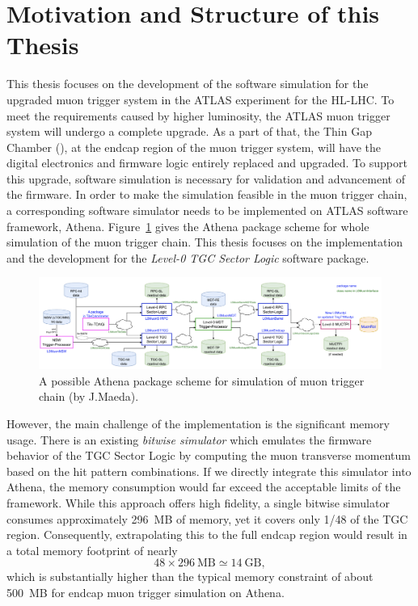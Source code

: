 \section{Motivation and Structure of this Thesis} \label{sec:motivation}
This thesis focuses on the development of the software simulation for the upgraded muon trigger system in the ATLAS experiment for the HL-LHC. To meet the requirements caused by higher luminosity, the ATLAS muon trigger system will undergo a complete upgrade. As a part of that, the Thin Gap Chamber (\TGC), at the endcap region of the muon trigger system, will have the digital electronics and firmware logic entirely replaced and upgraded. To support this upgrade, software simulation is necessary for validation and advancement of the firmware. In order to make the simulation feasible in the muon trigger chain, a corresponding software simulator needs to be implemented on ATLAS software framework, Athena. Figure~\ref{fig:L0_trigger_chain} gives the Athena package scheme for whole simulation of the muon trigger chain. This thesis focuses on the implementation and the development for the \textit{Level-0 TGC Sector Logic} software package.

\begin{figure}[htbp]
  \centering
  \includegraphics[width=1.0\textwidth]{figs/chapter1/L0_trigger_chain.png}
  \caption{A possible Athena package scheme for simulation of muon trigger chain (by J.Maeda).}
  \label{fig:L0_trigger_chain}
\end{figure}

However, the main challenge of the implementation is the significant memory usage. There is an existing \textit{bitwise simulator} which emulates the firmware behavior of the TGC Sector Logic by computing the muon transverse momentum based on the hit pattern combinations. If we directly integrate this simulator into Athena, the memory consumption would far exceed the acceptable limits of the framework. While this approach offers high fidelity, a single bitwise simulator consumes approximately 296~MB of memory, yet it covers only 1/48 of the TGC region. Consequently, extrapolating this to the full endcap region would result in a total memory footprint of nearly 
\[
48 \times 296~\text{MB} \simeq 14~\text{GB},
\]
which is substantially higher than the typical memory constraint of about 500~MB for endcap muon trigger simulation on Athena.

